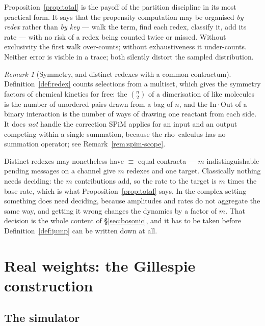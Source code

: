 \documentclass[11pt,a4paper]{article}
\theoremstyle{plain}
\theoremstyle{definition}
\theoremstyle{remark}
\newtheorem{remark}[theorem]{Remark}
\newcommand{\rhoc}{\textsf{rho}}
\begin{document}
Proposition~\ref{prop:total} is the payoff of the partition discipline in its most practical form.
It says that the propensity computation may be organised \emph{by redex} rather than \emph{by key} ---
walk the term, find each redex, classify it, add its rate --- with no risk of a redex being counted
twice or missed. Without exclusivity the first walk over-counts; without exhaustiveness it
under-counts. Neither error is visible in a trace; both silently distort the sampled distribution.

\begin{remark}[Symmetry, and distinct redexes with a common contractum]
\label{rem:distinct-contracta}
Definition~\ref{def:redex} counts selections from a multiset, which gives the symmetry factors of
chemical kinetics for free: the $\binom{n}{2}$ of a dimerisation of like molecules is the number of
unordered pairs drawn from a bag of $n$, and the $\mathrm{In}\cdot\mathrm{Out}$ of a binary
interaction is the number of ways of drawing one reactant from each side. It does \emph{not} handle
the correction SPiM applies for an input and an output competing within a single summation, because
the \rhoc\ calculus has no summation operator; see Remark~\ref{rem:spim-scope}.

Distinct redexes may nonetheless have $\equiv$-equal contracta --- $m$ indistinguishable pending
messages on a channel give $m$ redexes and one target. Classically nothing needs deciding: the $m$
contributions add, so the rate to the target is $m$ times the base rate, which is what
Proposition~\ref{prop:total} says. In the complex setting something does need deciding, because
amplitudes and rates do not aggregate the same way, and getting it wrong changes the dynamics by a
factor of $m$. That decision is the whole content of \S\ref{sec:bosonic}, and it has to be taken
before Definition~\ref{def:jump} can be written down at all.
\end{remark}

\section{Real weights: the Gillespie construction}
\label{sec:gillespie}

\subsection{The simulator}
\end{document}
